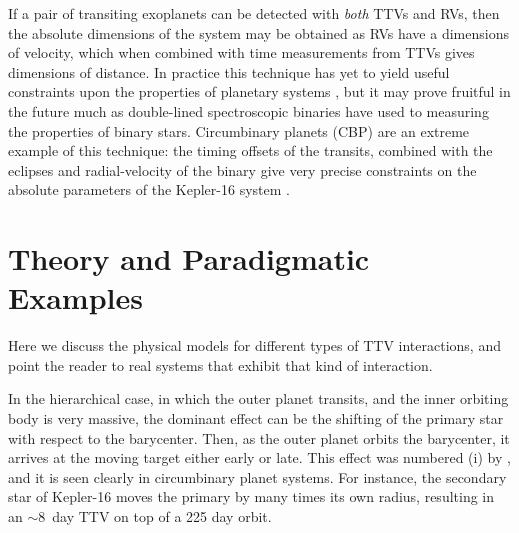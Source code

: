 \documentclass[graybox,natbib,nosecnum]{svmult}
\begin{document}
If a pair of transiting exoplanets can be detected with {\it both} TTVs and RVs, then the
absolute dimensions of the system may be obtained \citep{2005MNRAS.359..567A,
2013ApJ...762..112M} as RVs have a dimensions of velocity, which 
when combined with time measurements from TTVs gives dimensions of distance.
In practice this technique has yet to yield useful constraints upon the properties
of planetary systems \citep{2015MNRAS.453.2644A}, but it may prove fruitful
in the future much as double-lined spectroscopic binaries have used to measuring 
the properties of binary stars.  Circumbinary planets (CBP) are an extreme example
of this technique: the timing offsets of the transits, combined with the eclipses
and radial-velocity of the binary give very precise constraints on the absolute parameters
of the Kepler-16 system \citep{2011Sci...333.1602D}.


\section{Theory and Paradigmatic Examples} 

Here we discuss the physical models for different types of TTV interactions, and point the reader to real systems that exhibit that kind of interaction. 

In the hierarchical case, in which the outer planet transits, and the inner orbiting body is very massive, the dominant effect can be the shifting of the primary star with respect to the barycenter.   Then, as the outer planet orbits the barycenter, it arrives at the moving target either early or late.  This effect was numbered (i) by \cite{2005MNRAS.359..567A}, and it is seen clearly in circumbinary planet systems.  For instance, the secondary star of Kepler-16 \citep{2011Sci...333.1602D} moves the primary by many times its own radius, resulting in an $\sim 8$~day TTV on top of a 225 day orbit. 
\end{document}
